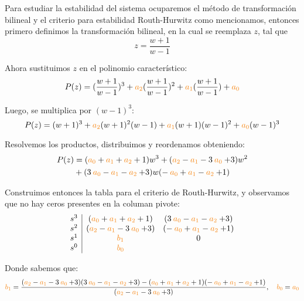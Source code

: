 Para estudiar la estabilidad del sistema ocuparemos el método de transformación
bilineal y el criterio para estabilidad Routh-Hurwitz como mencionamos, entonces
primero definimos la transformación bilineal, en la cual se reemplaza $z$, tal que 
\begin{equation}
    z = \frac{w+1}{w-1}
\end{equation}

Ahora sustituimos $z$ en el polinomio característico:
\begin{equation}
    P(z) = (\frac{w+1}{w-1})^3 + \nara{a_2} (\frac{w+1}{w-1})^2 + \nara{a_1} (\frac{w+1}{w-1}) + \nara{a_0}
\end{equation}

Luego, se multiplica por $(w-1)^3$:
\begin{equation}
    P(z) =  ({w+1})^3 + \nara{a_2} ({w+1})^2 (w-1) + \nara{a_1} ({w+1})(w-1)^2 + \nara{a_0}(w-1)^3
\end{equation}

Resolvemos los productos, distribuimos y reordenamos obteniendo:
\begin{align}
  P(z) &= (\nara{a_0} + \nara{a_1} + \nara{a_2} + 1) w^3 
    + (\nara{a_2} - \nara{a_1} - 3\nara{a_0} + 3) w^2 \nonumber \\ 
    &+ (3\nara{a_0} - \nara{a_1} - \nara{a_2} + 3) w 
    (- \nara{a_0} + \nara{a_1} - \nara{a_2} + 1)
\end{align}

Construimos entonces la tabla para el criterio de Routh-Hurwitz, y observamos
que no hay ceros presentes en la columan pivote:
\begin{equation}
  \begin{array}{c|cc}
    s^3 & (\nara{a_0} + \nara{a_1} + \nara{a_2} + 1) & (3\nara{a_0} - \nara{a_1} - \nara{a_2} + 3)  \\
    s^2 & (\nara{a_2} - \nara{a_1} - 3\nara{a_0} + 3)  & (- \nara{a_0} + \nara{a_1} - \nara{a_2} + 1) \\
    s^1 & \nara{b_1} & 0 \\
    s^0 & \nara{b_0} & 
  \end{array}
\end{equation}

Donde sabemos que:
\begin{align}
  \nara{b_1} = \frac{(\nara{a_2} - \nara{a_1} - 3\nara{a_0} + 3) (3\nara{a_0} - \nara{a_1} - \nara{a_2} + 3) - (\nara{a_0} + \nara{a_1} + \nara{a_2} + 1)(- \nara{a_0} + \nara{a_1} - \nara{a_2} + 1)}{(\nara{a_2} - \nara{a_1} - 3\nara{a_0} + 3)},\quad
  \nara{b_0} = \nara{a_0}
\end{align}

